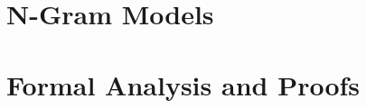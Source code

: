 \documentclass[11pt,letterpaper]{article}
\begin{document}
\section{N-Gram Models}







%
%
%
%
%
%


\section{Formal Analysis and Proofs}

\end{document}
